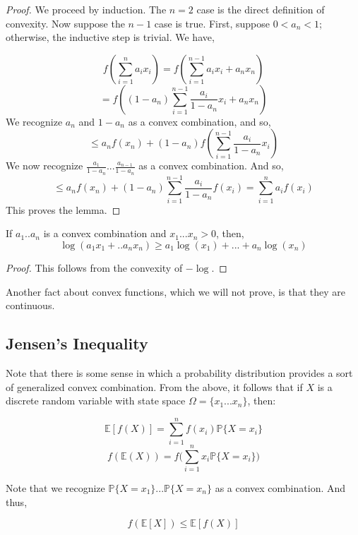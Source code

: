     \begin{proof}
        We proceed by induction. The $n=2$ case is the direct definition of convexity. 
        Now suppose the $n-1$ case is true. First, suppose $0 < a_n < 1$; otherwise, the 
        inductive step is trivial. We have,

        \[ f(\sum_{i=1}^n a_i x_i) = f(\sum_{i=1}^{n-1} a_i x_i + a_n x_n) \]
        \[ = f((1-a_n)\sum_{i=1}^{n-1} \frac{a_i}{1-a_n} x_i + a_n x_n) \]
        We recognize $a_n$ and $1-a_n$ as a convex combination, and so, 
        \[ \leq a_n f(x_n) + (1-a_n) f(\sum_{i=1}^{n-1} \frac{a_i}{1-a_n} x_i) \] 
        We now recognize $\frac{a_1}{1-a_n}... \frac{a_{n-1}}{1-a_n}$ as a convex 
        combination. And so, 
        \[ \leq a_n f(x_n) + (1-a_n)\sum_{i=1}^{n-1} \frac{a_i}{1-a_n}f(x_i) = \sum_{i=1}^n a_i f(x_i) \]
        This proves the lemma.

    \end{proof}

    \begin{corollary}\label{cor:cool_log_property}
        If $a_1..a_n$ is a convex combination and $x_1...x_n > 0$, then, 
        \[ \log(a_1x_1 + .. a_nx_n) \geq a_1\log(x_1) + ... + a_n\log(x_n) \]
    \end{corollary}
    \begin{proof}
        This follows from the convexity of $-\log$.
    \end{proof}

    Another fact about convex functions, which we will not prove, is that they are continuous.

    \subsection{Jensen's Inequality}

    Note that there is some sense in which a probability distribution provides a sort of 
    generalized convex combination. From the above, it follows that if $X$ is a discrete random variable with 
    state space $\Omega = \{x_1...x_n\}$, then: 

    \[ \mathbb E[f(X)] = \sum_{i=1}^n f(x_i) \mathbb P\{X = x_i\} \]
    \[ f(\mathbb E(X)) = f\bigg(\sum_{i=1}^n x_i \mathbb P\{X = x_i\} \bigg) \]

    Note that we recognize $\mathbb P\{X = x_1\}... \mathbb P\{X=x_n\}$ as a convex combination. 
    And thus, 

    \[ f(\mathbb E[X]) \leq \mathbb E[f(X)]  \]

